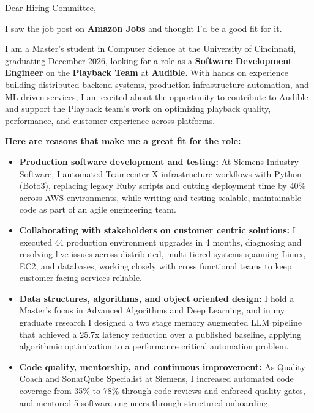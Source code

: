 \documentclass[11pt]{letter}
\date{}
\begin{document}
\begin{letter}{}

\opening{Dear Hiring Committee,}

I saw the job post on \textbf{Amazon Jobs} and thought I'd be a good fit for it.

I am a Master's student in Computer Science at the University of Cincinnati, graduating December 2026, looking for a role as a \textbf{Software Development Engineer} on the \textbf{Playback Team} at \textbf{Audible}. With hands on experience building distributed backend systems, production infrastructure automation, and ML driven services, I am excited about the opportunity to contribute to Audible and support the Playback team's work on optimizing playback quality, performance, and customer experience across platforms.

\textbf{Here are reasons that make me a great fit for the role:}

\begin{itemize}[leftmargin=*, itemsep=0.45em]
    \item \textbf{Production software development and testing:} At Siemens Industry Software, I automated Teamcenter X infrastructure workflows with Python (Boto3), replacing legacy Ruby scripts and cutting deployment time by 40\% across AWS environments, while writing and testing scalable, maintainable code as part of an agile engineering team.

    \item \textbf{Collaborating with stakeholders on customer centric solutions:} I executed 44 production environment upgrades in 4 months, diagnosing and resolving live issues across distributed, multi tiered systems spanning Linux, EC2, and databases, working closely with cross functional teams to keep customer facing services reliable.

    \item \textbf{Data structures, algorithms, and object oriented design:} I hold a Master's focus in Advanced Algorithms and Deep Learning, and in my graduate research I designed a two stage memory augmented LLM pipeline that achieved a 25.7x latency reduction over a published baseline, applying algorithmic optimization to a performance critical automation problem.

    \item \textbf{Code quality, mentorship, and continuous improvement:} As Quality Coach and SonarQube Specialist at Siemens, I increased automated code coverage from 35\% to 78\% through code reviews and enforced quality gates, and mentored 5 software engineers through structured onboarding.


\end{itemize}
\end{letter}
\end{document}

